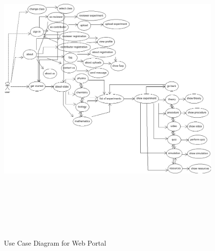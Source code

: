 \documentclass[12pt]{report}
\begin{document}
\pagebreak


\begin{figure}[H]
 \centering
 \includegraphics[width=12cm, height=16cm]{./use_case_web_new.png}
 \caption{Use Case Diagram for Web Portal\label{fig:use_case_web_new}}
\end{figure}

\pagebreak
\end{document}
